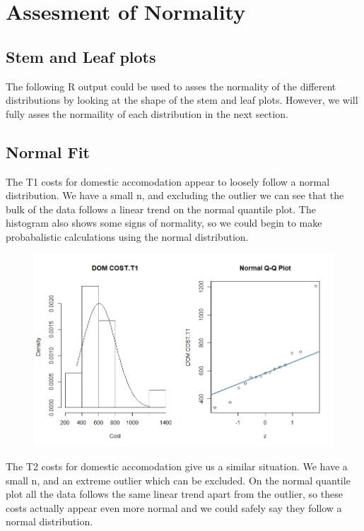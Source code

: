 \documentclass[]{article}
\begin{document}
\section{Assesment of Normality}
\subsection{Stem and Leaf plots}
The following R output could be used to asses the normality of the different distributions by looking at the shape of the stem and leaf plots. However, we will fully asses the normaility of each distribution in the next section.


\newpage
\subsection{Normal Fit}
The T1 costs for domestic accomodation appear to loosely follow a normal distribution. We have a small n, and excluding the outlier we can see that the bulk of the data follows a linear trend on the normal quantile plot. The histogram also shows some signs of normality, so we could begin to make probabalistic calculations using the normal distribution.
\begin{figure}[H]
\centering
\includegraphics[width=12cm]{RStudio/jpeg/Norm_DOM_T1.jpeg}
\end{figure}
The T2 costs for domestic accomodation give us a similar situation. We have a small n, and an extreme outlier which can be excluded. On the normal quantile plot all the data follows the same linear trend apart from the outlier, so these costs actually appear even more normal and we could safely say they follow a normal distribution.
\end{document}
